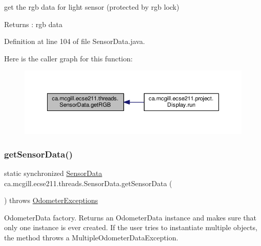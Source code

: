 get the rgb data for light sensor (protected by rgb lock)

\begin{DoxyReturn}{Returns}
\+: rgb data 
\end{DoxyReturn}


Definition at line 104 of file Sensor\+Data.\+java.

Here is the caller graph for this function\+:
\nopagebreak
\begin{figure}[H]
\begin{center}
\leavevmode
\includegraphics[width=350pt]{classca_1_1mcgill_1_1ecse211_1_1threads_1_1_sensor_data_a76313564e284f5cdb66aefce4e595f3b_icgraph}
\end{center}
\end{figure}
\mbox{\label{classca_1_1mcgill_1_1ecse211_1_1threads_1_1_sensor_data_a8260aba53b4474ca1275e4ce26157977}} 
\subsubsection{\texorpdfstring{get\+Sensor\+Data()}{getSensorData()}}
{\footnotesize\ttfamily static synchronized \hyperlink{classca_1_1mcgill_1_1ecse211_1_1threads_1_1_sensor_data}{Sensor\+Data} ca.\+mcgill.\+ecse211.\+threads.\+Sensor\+Data.\+get\+Sensor\+Data (\begin{DoxyParamCaption}{ }\end{DoxyParamCaption}) throws \hyperlink{classca_1_1mcgill_1_1ecse211_1_1odometer_1_1_odometer_exceptions}{Odometer\+Exceptions}\hspace{0.3cm}{\ttfamily [static]}}

Odometer\+Data factory. Returns an Odometer\+Data instance and makes sure that only one instance is ever created. If the user tries to instantiate multiple objects, the method throws a Multiple\+Odometer\+Data\+Exception.

